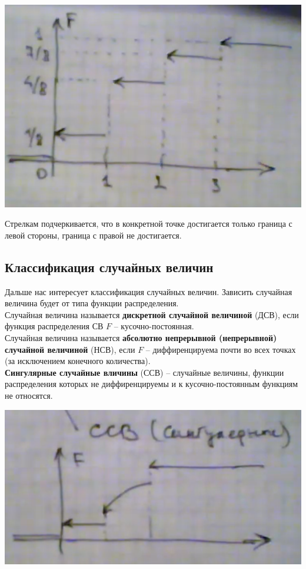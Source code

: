 \documentclass{article}
\begin{document}
\begin{center}
    \includegraphics[scale=0.6]{5.png}
\end{center}

Стрелкам подчеркивается, что в конкретной точке достигается только граница с левой стороны, граница с правой не достигается.

\subsection{Классификация случайных величин}

Дальше нас интересует классификация случайных величин. Зависить случайная величина будет от типа функции распределения.\\

Случайная величина называется \textbf{дискретной случайной величиной} (ДСВ), если функция распределения СВ $F$ -- кусочно-постоянная.
\\

Случайная величина называется \textbf{абсолютно непрерывной (непрерывной) случайной величиной} (НСВ), если $F$ -- диффиренцируема почти во всех точках (за исключением конечного количества). 
\\

\textbf{Сингулярные случайные вличины} (ССВ) -- случайные величины, функции распределения которых не диффиренцируемы и к кусочно-постоянным функциям не относятся.

\begin{center}
    \includegraphics[scale=0.6]{6.png}
\end{center}
\end{document}
